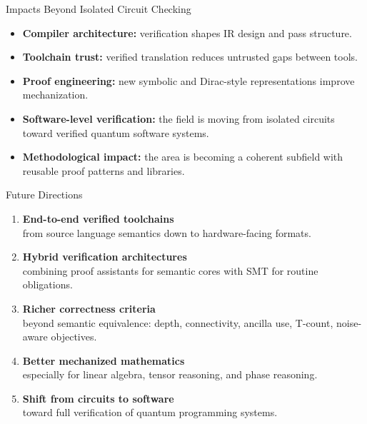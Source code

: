 \documentclass[aspectratio=169]{beamer}
\begin{document}
\begin{frame}{Impacts Beyond Isolated Circuit Checking}
\justifying
\begin{itemize}
    \item \textbf{Compiler architecture:} verification shapes IR design and pass structure.
    \item \textbf{Toolchain trust:} verified translation reduces untrusted gaps between tools.
    \item \textbf{Proof engineering:} new symbolic and Dirac-style representations improve mechanization.
    \item \textbf{Software-level verification:} the field is moving from isolated circuits toward verified quantum software systems.
    \item \textbf{Methodological impact:} the area is becoming a coherent subfield with reusable proof patterns and libraries.
\end{itemize}
\end{frame}

\begin{frame}{Future Directions}
\justifying
\begin{enumerate}
    \item \textbf{End-to-end verified toolchains} \\
    from source language semantics down to hardware-facing formats.
    
    \item \textbf{Hybrid verification architectures} \\
    combining proof assistants for semantic cores with SMT for routine obligations.
    
    \item \textbf{Richer correctness criteria} \\
    beyond semantic equivalence: depth, connectivity, ancilla use, T-count, noise-aware objectives.
    
    \item \textbf{Better mechanized mathematics} \\
    especially for linear algebra, tensor reasoning, and phase reasoning.
    
    \item \textbf{Shift from circuits to software} \\
    toward full verification of quantum programming systems.
\end{enumerate}
\end{frame}
\end{document}
